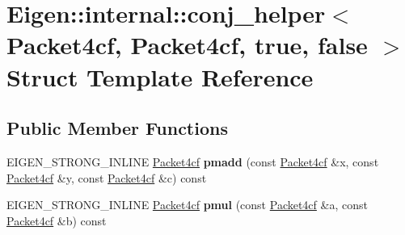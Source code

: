 \hypertarget{struct_eigen_1_1internal_1_1conj__helper_3_01_packet4cf_00_01_packet4cf_00_01true_00_01false_01_4}{}\section{Eigen\+:\+:internal\+:\+:conj\+\_\+helper$<$ Packet4cf, Packet4cf, true, false $>$ Struct Template Reference}
\label{struct_eigen_1_1internal_1_1conj__helper_3_01_packet4cf_00_01_packet4cf_00_01true_00_01false_01_4}
\subsection*{Public Member Functions}
\begin{DoxyCompactItemize}
\item 
\mbox{\label{struct_eigen_1_1internal_1_1conj__helper_3_01_packet4cf_00_01_packet4cf_00_01true_00_01false_01_4_a31f5ab661b7a9412aac6e9ec5d0e47e7}} 
E\+I\+G\+E\+N\+\_\+\+S\+T\+R\+O\+N\+G\+\_\+\+I\+N\+L\+I\+NE \hyperlink{struct_eigen_1_1internal_1_1_packet4cf}{Packet4cf} {\bfseries pmadd} (const \hyperlink{struct_eigen_1_1internal_1_1_packet4cf}{Packet4cf} \&x, const \hyperlink{struct_eigen_1_1internal_1_1_packet4cf}{Packet4cf} \&y, const \hyperlink{struct_eigen_1_1internal_1_1_packet4cf}{Packet4cf} \&c) const
\item 
\mbox{\label{struct_eigen_1_1internal_1_1conj__helper_3_01_packet4cf_00_01_packet4cf_00_01true_00_01false_01_4_a18cb647e7118b87040773cb6ba846076}} 
E\+I\+G\+E\+N\+\_\+\+S\+T\+R\+O\+N\+G\+\_\+\+I\+N\+L\+I\+NE \hyperlink{struct_eigen_1_1internal_1_1_packet4cf}{Packet4cf} {\bfseries pmul} (const \hyperlink{struct_eigen_1_1internal_1_1_packet4cf}{Packet4cf} \&a, const \hyperlink{struct_eigen_1_1internal_1_1_packet4cf}{Packet4cf} \&b) const
\item 
\mbox{\label{struct_eigen_1_1internal_1_1conj__helper_3_01_packet4cf_00_01_packet4cf_00_01true_00_01false_01_4_a31f5ab661b7a9412aac6e9ec5d0e47e7}} 

\end{DoxyCompactItemize}
